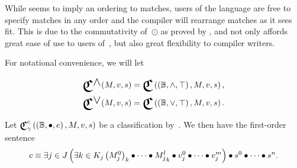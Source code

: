 While  seems to imply an ordering to matches,
  users of the language are free to specify matches in any order
    and the compiler will rearrange matches as it sees fit.
This is due to the commutativity of~$\odot$ as proved by
  ,
    and not only affords great ease of use to users of~\tame{},
      but also great flexibility to compiler writers.

For notational convenience,
  we will let

\begin{equation}
\begin{aligned}
  \Classifyland(M,v,s)
    &= \Classify\left(\Monoid\Bool\land\true,M,v,s\right), \\
  \Classifylor(M,v,s)
    &= \Classify\left(\Monoid\Bool\lor\true,M,v,s\right). \\
\end{aligned}
\end{equation}


\def\cpredmatseq{{M^0_j}_k \monoidops {M^l_j}_k}
\def\cpredvecseq{v^0_j\monoidops v^m_j}
\def\cpredscalarseq{s^0\monoidops s^n}


\begin{axiom}
  Let $\Classify^c_\gamma\left(\Monoid\Bool\monoidop e,M,v,s\right)$ be a
    classification by~.
  We then have the first-order sentence
  \begin{equation*}
    c \equiv
      {} \Exists{j\in J}{\Exists{k\in K_j}\cpredmatseq\monoidop\cpredvecseq}
        \monoidop\cpredscalarseq.
  \end{equation*}
\end{axiom}


